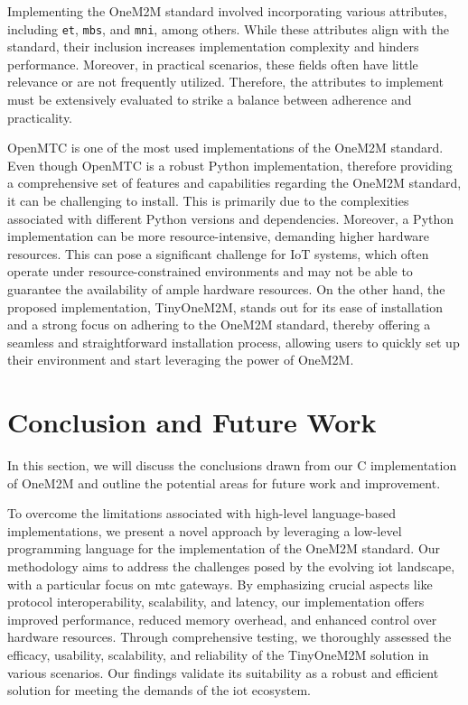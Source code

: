 \documentclass[a4paper,fleqn]{cas-dc}
\begin{document}
Implementing the OneM2M standard involved incorporating various attributes, including \texttt{et}, \texttt{mbs}, and \texttt{mni}, among others. While these attributes align with the standard, their inclusion increases implementation complexity and hinders performance. Moreover, in practical scenarios, these fields often have little relevance or are not frequently utilized. Therefore, the attributes to implement must be extensively evaluated to strike a balance between adherence and practicality.

OpenMTC is one of the most used implementations of the OneM2M standard. Even though OpenMTC is a robust Python implementation, therefore providing a comprehensive set of features and capabilities regarding the OneM2M standard, it can be challenging to install. This is primarily due to the complexities associated with different Python versions and dependencies. Moreover, a Python implementation can be more resource-intensive, demanding higher hardware resources. This can pose a significant challenge for IoT systems, which often operate under resource-constrained environments and may not be able to guarantee the availability of ample hardware resources. On the other hand, the proposed implementation, TinyOneM2M, stands out for its ease of installation and a strong focus on adhering to the OneM2M standard, thereby offering a seamless and straightforward installation process, allowing users to quickly set up their environment and start leveraging the power of OneM2M.

\section{Conclusion and Future Work}
\label{conclusion}

In this section, we will discuss the conclusions drawn from our C implementation of OneM2M and outline the potential areas for future work and improvement.

To overcome the limitations associated with high-level language-based implementations, we present a novel approach by leveraging a low-level programming language for the implementation of the OneM2M standard. Our methodology aims to address the challenges posed by the evolving \gls{iot} landscape, with a particular focus on \gls{mtc} gateways. By emphasizing crucial aspects like protocol interoperability, scalability, and latency, our implementation offers improved performance, reduced memory overhead, and enhanced control over hardware resources. Through comprehensive testing, we thoroughly assessed the efficacy, usability, scalability, and reliability of the TinyOneM2M solution in various scenarios. Our findings validate its suitability as a robust and efficient solution for meeting the demands of the \gls{iot} ecosystem.
\end{document}
